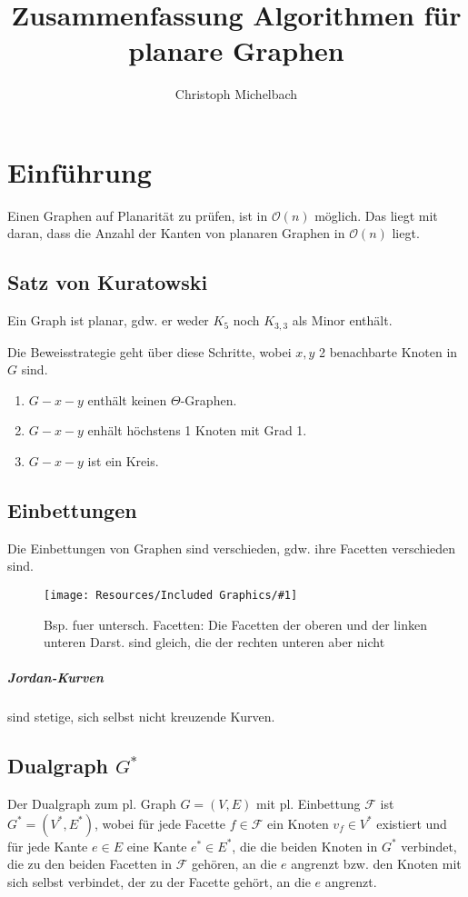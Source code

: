 \documentclass[a4paper,11pt]{report}
\title{Zusammenfassung Algorithmen für planare Graphen}
\author{Christoph Michelbach}
\newcommand{\fig}[2]{
    \begin{figure}[h]
        \begin{center}
            \texttt{[image: Resources/Included Graphics/\#1]}
            \caption{#1}
            \label{fig:#1}
        \end{center}
    \end{figure}
}
\begin{document}
\maketitle
\tableofcontents

\chapter{Einführung}
Einen Graphen auf Planarität zu prüfen, ist in $\mathcal{O}(n)$ möglich. Das liegt mit daran, dass die Anzahl der Kanten von planaren Graphen in $\mathcal{O}(n)$ liegt.

\section{Satz von Kuratowski}
Ein Graph ist planar, gdw. er weder $K_5$ noch $K_{3, 3}$ als Minor enthält.

Die Beweisstrategie geht über diese Schritte, wobei $x, y$ 2 benachbarte Knoten in $G$ sind.
\begin{enumerate}
    \item $G - x - y$ enthält keinen $\Theta$-Graphen.
    \item $G - x - y$ enhält höchstens 1 Knoten mit Grad 1.
    \item $G - x - y$ ist ein Kreis.
\end{enumerate}

\section{Einbettungen}
Die Einbettungen von Graphen sind verschieden, gdw. ihre Facetten verschieden sind.
\fig{Bsp. fuer untersch. Facetten: Die Facetten der oberen und der linken unteren Darst. sind gleich, die der rechten unteren aber nicht}{.7}

\paragraph{Jordan-Kurven} sind stetige, sich selbst nicht kreuzende Kurven.


\section{Dualgraph $G^*$}
Der Dualgraph zum pl. Graph $G = (V, E)$ mit pl. Einbettung $\mathcal{F}$ ist $G^* = (V^*, E^*)$, wobei für jede Facette $f \in \mathcal{F}$ ein Knoten $v_f \in V^*$ existiert und für jede Kante $e \in E$ eine Kante $e^* \in E^*$, die die beiden Knoten in $G^*$ verbindet, die zu den beiden Facetten in $\mathcal{F}$ gehören, an die $e$ angrenzt bzw. den Knoten mit sich selbst verbindet, der zu der Facette gehört, an die $e$ angrenzt.\\
\end{document}
